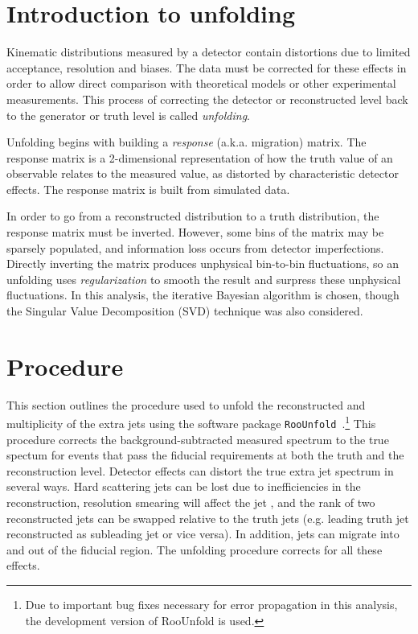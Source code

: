 \section{Introduction to unfolding}
Kinematic distributions measured by a detector contain distortions due to limited acceptance, resolution and biases. The data must be corrected for these effects in order to allow direct comparison with theoretical models or other experimental measurements. This process of correcting the detector or reconstructed level back to the generator or truth level is called \emph{unfolding}.


Unfolding begins with building a \emph{response} (a.k.a. migration) matrix. The response matrix is a 2-dimensional representation of how the truth value of an observable relates to the measured value, as distorted by characteristic detector effects. The response matrix is built from simulated data.

In order to go from a reconstructed distribution to a truth distribution, the response matrix must be inverted. However, some bins of the matrix may be sparsely populated, and information loss occurs from detector imperfections. Directly inverting the matrix produces unphysical bin-to-bin fluctuations, so an unfolding uses \emph{regularization} to smooth the result and surpress these unphysical fluctuations. In this analysis, the iterative Bayesian algorithm is chosen, though the Singular Value Decomposition (SVD) technique was also considered.

\section{Procedure}
This section outlines the procedure used to unfold the reconstructed \pt and multiplicity of the 
extra jets using the software package \texttt{RooUnfold}~\cite{roounfold}.\footnote{Due to important bug fixes necessary for error propagation in this analysis, the development version of RooUnfold is used.}
This procedure corrects the background-subtracted measured spectrum to the true
spectum for events that pass the fiducial requirements at both the truth and the reconstruction level.
Detector effects can distort the true extra jet spectrum in several ways.  Hard scattering jets can be lost due to
inefficiencies in the reconstruction, resolution smearing will affect the jet \pt, and the rank of two
reconstructed jets can be swapped relative to the truth jets  (e.g. leading truth jet reconstructed as subleading jet or vice versa).
In addition, jets can migrate  into and out of the fiducial region.  The unfolding procedure corrects for all these effects.

